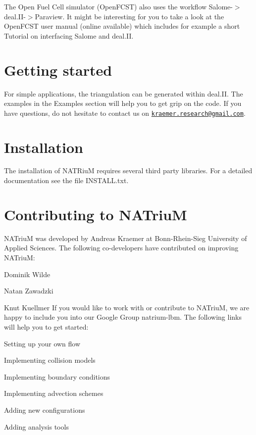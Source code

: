 The Open Fuel Cell simulator (OpenFCST) also uses the workflow Salome-\/$>$deal.II-\/$>$Paraview. It might be interesting for you to take a look at the OpenFCST user manual (online available) which includes for example a short Tutorial on interfacing Salome and deal.II.\hypertarget{index_start_sec}{}\section{Getting started}\label{index_start_sec}
For simple applications, the triangulation can be generated within deal.II. The examples in the Examples section will help you to get grip on the code. If you have questions, do not hesitate to contact us on \href{mailto:kraemer.research@gmail.com}{\tt kraemer.research@gmail.com}.\hypertarget{index_install_sec}{}\section{Installation}\label{index_install_sec}
The installation of NATRiuM requires several third party libraries. For a detailed documentation see the file INSTALL.txt.\hypertarget{index_contrib_sec}{}\section{Contributing to NATriuM}\label{index_contrib_sec}
NATriuM was developed by Andreas Kraemer at Bonn-\/Rhein-\/Sieg University of Applied Sciences. The following co-\/developers have contributed on improving NATriuM:
\begin{DoxyItemize}
\item Dominik Wilde
\item Natan Zawadzki
\item Knut Kuellmer If you would like to work with or contribute to NATriuM, we are happy to include you into our Google Group natrium-\/lbm. The following links will help you to get started:
\item Setting up your own flow
\item Implementing collision models
\item Implementing boundary conditions
\item Implementing advection schemes
\item Adding new configurations
\item Adding analysis tools 
\end{DoxyItemize}